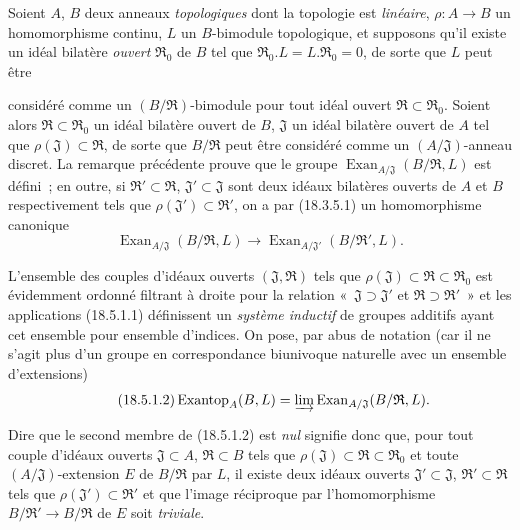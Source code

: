 \begin{env}[18.5.1]
\label{0.18.5.1-fr}
Soient $A$, $B$ deux anneaux \emph{topologiques} dont la topologie est
\emph{linéaire}, $\rho:A\to B$ un homomorphisme continu, $L$ un $B$-bimodule
topologique, et supposons qu'il existe un idéal bilatère \emph{ouvert}
$\mathfrak R_0$ de $B$ tel que
$\mathfrak R_0.L=L.\mathfrak R_0=0$, de sorte que $L$ peut être


considéré comme un $(B/\mathfrak R)$-bimodule pour tout idéal ouvert
$\mathfrak R\subset\mathfrak R_0$. Soient alors
$\mathfrak R\subset\mathfrak R_0$ un idéal bilatère ouvert de $B$,
$\mathfrak J$ un idéal bilatère ouvert de $A$ tel que
$\rho(\mathfrak J)\subset\mathfrak R$, de sorte que $B/\mathfrak R$ peut être
considéré comme un $(A/\mathfrak J)$-anneau discret. La remarque précédente
prouve que le groupe
$\operatorname{Exan}_{A/\mathfrak J}(B/\mathfrak R,L)$ est défini~; en outre,
si $\mathfrak R'\subset\mathfrak R$, $\mathfrak J'\subset\mathfrak J$ sont
deux idéaux bilatères ouverts de $A$ et $B$ respectivement tels que
$\rho(\mathfrak J')\subset\mathfrak R'$, on a par (18.3.5.1) un homomorphisme
canonique
\begin{equation}
\label{0.18.5.1.1-fr}
\tag{18.5.1.1}
  \operatorname{Exan}_{A/\mathfrak J}(B/\mathfrak R,L)
  \longrightarrow
  \operatorname{Exan}_{A/\mathfrak J'}(B/\mathfrak R',L).
\end{equation}

L'ensemble des couples d'idéaux ouverts $(\mathfrak J,\mathfrak R)$ tels que
$\rho(\mathfrak J)\subset\mathfrak R\subset\mathfrak R_0$ est évidemment
ordonné filtrant à droite pour la relation «~$\mathfrak J\supset\mathfrak J'$
et $\mathfrak R\supset\mathfrak R'$~» et les applications (18.5.1.1)
définissent un \emph{système inductif} de groupes additifs ayant cet ensemble
pour ensemble d'indices. On pose, par abus de notation (car il ne s'agit plus
d'un groupe en correspondance biunivoque naturelle avec un ensemble
d'extensions)
\begin{equation}
\label{0.18.5.1.2-fr}
\tag{18.5.1.2}
  \operatorname{Exantop}_A(B,L)
  =\varinjlim\operatorname{Exan}_{A/\mathfrak J}(B/\mathfrak R,L).
\end{equation}

Dire que le second membre de (18.5.1.2) est \emph{nul} signifie donc que, pour
tout couple d'idéaux ouverts $\mathfrak J\subset A$, $\mathfrak R\subset B$
tels que $\rho(\mathfrak J)\subset\mathfrak R\subset\mathfrak R_0$ et toute
$(A/\mathfrak J)$-extension $E$ de $B/\mathfrak R$ par $L$, il existe deux
idéaux ouverts $\mathfrak J'\subset\mathfrak J$,
$\mathfrak R'\subset\mathfrak R$ tels que
$\rho(\mathfrak J')\subset\mathfrak R'$ et que l'image réciproque par
l'homomorphisme $B/\mathfrak R'\to B/\mathfrak R$ de $E$ soit \emph{triviale}.


\end{env}
